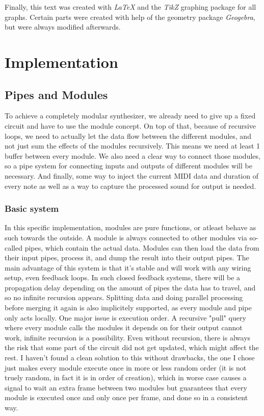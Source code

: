\documentclass[11pt,a4paper]{article}
\begin{document}
Finally, this text was created with \emph{LaTeX} and the \emph{TikZ} graphing package for all graphs. Certain parts were created with help of the geometry package \emph{Geogebra}, but were always modified afterwards.

\clearpage

\section{Implementation}

\subsection{Pipes and Modules}

To achieve a completely modular synthesizer, we already need to give up a fixed circuit and have to use the module concept. On top of that, because of recursive loops, we need to actually let the data flow between the different modules, and not just sum the effects of the modules recursively. This means we need at least 1 buffer between every module. We also need a clear way to connect those modules, so a pipe system for connecting inputs and outputs of different modules will be necessary. And finally, some way to inject the current MIDI data and duration of every note as well as a way to capture the processed sound for output is needed.

\subsubsection{Basic system}

In this specific implementation, modules are pure functions, or atleast behave as such towards the outside. A module is always connected to other modules via so-called pipes, which contain the actual data. Modules can then load the data from their input pipes, process it, and dump the result into their output pipes. The main advantage of this system is that it's stable and will work with any wiring setup, even feedback loops. In such closed feedback systems, there will be a propagation delay depending on the amount of pipes the data has to travel, and so no infinite recursion appears. Splitting data and doing parallel processing before merging it again is also implicitely supported, as every module and pipe only acts locally.
One major issue is execution order. A recursive "pull" query where every module calls the modules it depends on for their output cannot work, infinite recursion is a possibility. Even without recursion, there is always the risk that some part of the circuit did not get updated, which might affect the rest. I haven't found a clean solution to this without drawbacks, the one I chose just makes every module execute once in more or less random order (it is not truely random, in fact it is in order of creation), which in worse case causes a signal to wait an extra frame between two modules but guarantees that every module is executed once and only once per frame, and done so in a consistent way.
\end{document}
